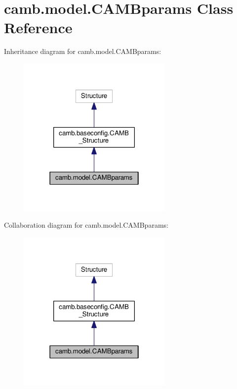 \hypertarget{classcamb_1_1model_1_1CAMBparams}{}\section{camb.\+model.\+C\+A\+M\+Bparams Class Reference}
\label{classcamb_1_1model_1_1CAMBparams}


Inheritance diagram for camb.\+model.\+C\+A\+M\+Bparams\+:
\nopagebreak
\begin{figure}[H]
\begin{center}
\leavevmode
\includegraphics[width=214pt]{classcamb_1_1model_1_1CAMBparams__inherit__graph}
\end{center}
\end{figure}


Collaboration diagram for camb.\+model.\+C\+A\+M\+Bparams\+:
\nopagebreak
\begin{figure}[H]
\begin{center}
\leavevmode
\includegraphics[width=214pt]{classcamb_1_1model_1_1CAMBparams__coll__graph}
\end{center}
\end{figure}
